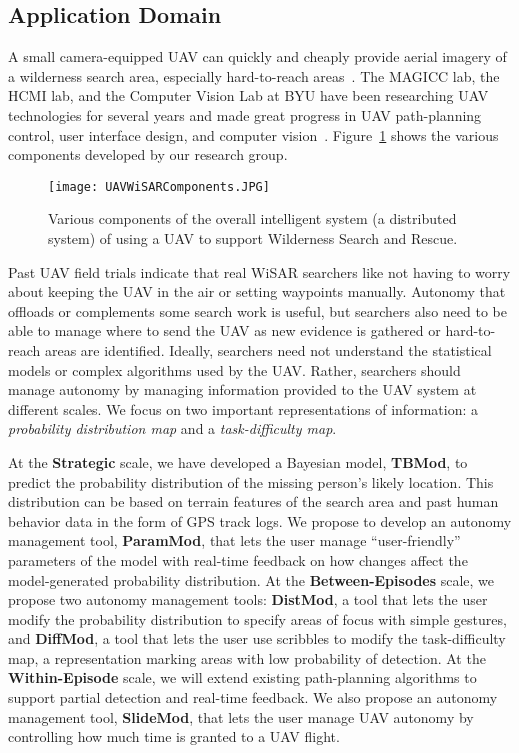 \subsection{Application Domain}

A small camera-equipped UAV can quickly and cheaply provide aerial imagery of a wilderness search area, especially hard-to-reach areas~\cite{Goodrich2008Supporting}. The MAGICC lab, the HCMI lab, and the Computer Vision Lab at BYU have been researching UAV technologies for several years and made great progress in UAV path-planning control, user interface design, and computer vision~\cite{Lin2010Supporting}. Figure~\ref{SystemComponents} shows the various components developed by our research group.

\begin{figure}
\centering
\texttt{[image: UAVWiSARComponents.JPG]}
\caption{Various components of the overall intelligent system (a distributed system) of using a UAV to support Wilderness Search and Rescue.}
\label{SystemComponents}
\end{figure}

Past UAV field trials indicate that real WiSAR searchers like not having to worry about keeping the UAV in the air or setting waypoints manually. Autonomy that offloads or complements some search work is useful, but searchers also need to be able to manage where to send the UAV as new evidence is gathered or hard-to-reach areas are identified. Ideally, searchers need not understand the statistical models or complex algorithms used by the UAV. Rather, searchers should manage autonomy by managing information provided to the UAV system at different scales. We focus on two important representations of information: a \textit{probability distribution map} and a \textit{task-difficulty map}.

At the \textbf{Strategic} scale, we have developed a Bayesian model, \textbf{TBMod}, to predict the probability distribution of the missing person's likely location. This distribution can be based on terrain features of the search area and past human behavior data in the form of GPS track logs. We propose to develop an autonomy management tool, \textbf{ParamMod}, that lets the user manage ``user-friendly'' parameters of the model with real-time feedback on how changes affect the model-generated probability distribution. At the \textbf{Between-Episodes} scale, we propose two autonomy management tools: \textbf{DistMod}, a tool that lets the user modify the probability distribution to specify areas of focus with simple gestures, and \textbf{DiffMod}, a tool that lets the user use scribbles to modify the task-difficulty map, a representation marking areas with low probability of detection. At the \textbf{Within-Episode} scale, we will extend existing path-planning algorithms to support partial detection and real-time feedback. We also propose an autonomy management tool, \textbf{SlideMod}, that lets the user manage UAV autonomy by controlling how much time is granted to a UAV flight. 


